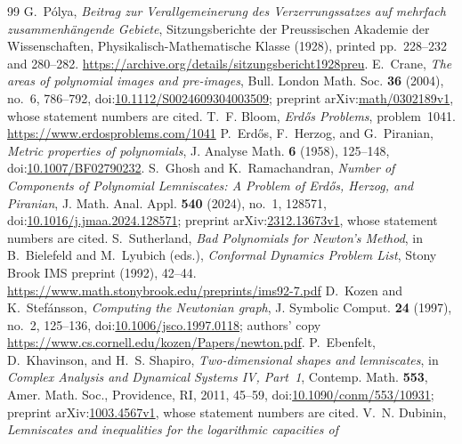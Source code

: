 \documentclass[11pt]{article}
\begin{document}
\begin{thebibliography}{99}
 G.~P\'olya,
  \emph{Beitrag zur Verallgemeinerung des Verzerrungssatzes auf mehrfach
  zusammenh\"angende Gebiete}, Sitzungsberichte der Preussischen Akademie der
  Wissenschaften, Physikalisch-Mathematische Klasse (1928), printed
  pp.~228--232 and 280--282.
  \url{https://archive.org/details/sitzungsbericht1928preu}.
 E.~Crane,
  \emph{The areas of polynomial images and pre-images}, Bull. London Math.
  Soc. \textbf{36} (2004), no.~6, 786--792,
  doi:\href{https://doi.org/10.1112/S0024609304003509}{10.1112/S0024609304003509};
  preprint arXiv:\href{https://arxiv.org/abs/math/0302189v1}{math/0302189v1},
  whose statement numbers are cited.
 T.~F. Bloom, \emph{Erd\H{o}s Problems}, problem~1041.
  \url{https://www.erdosproblems.com/1041}
 P.~Erd\H{o}s, F.~Herzog, and G.~Piranian,
  \emph{Metric properties of polynomials}, J. Analyse Math. \textbf{6}
  (1958), 125--148,
  doi:\href{https://doi.org/10.1007/BF02790232}{10.1007/BF02790232}.
 S.~Ghosh and K.~Ramachandran,
  \emph{Number of Components of Polynomial Lemniscates: A Problem of Erd\H{o}s,
  Herzog, and Piranian}, J. Math. Anal. Appl. \textbf{540} (2024), no.~1,
  128571,
  doi:\href{https://doi.org/10.1016/j.jmaa.2024.128571}{10.1016/j.jmaa.2024.128571};
  preprint arXiv:\href{https://arxiv.org/abs/2312.13673v1}{2312.13673v1},
  whose statement numbers are cited.
 S.~Sutherland,
  \emph{Bad Polynomials for Newton's Method}, in B.~Bielefeld and M.~Lyubich
  (eds.), \emph{Conformal Dynamics Problem List}, Stony Brook IMS preprint
  (1992), 42--44.
  \url{https://www.math.stonybrook.edu/preprints/ims92-7.pdf}
 D.~Kozen and K.~Stef\'ansson,
  \emph{Computing the Newtonian graph}, J. Symbolic Comput. \textbf{24}
  (1997), no.~2, 125--136,
  doi:\href{https://doi.org/10.1006/jsco.1997.0118}{10.1006/jsco.1997.0118};
  authors' copy \url{https://www.cs.cornell.edu/kozen/Papers/newton.pdf}.
 P.~Ebenfelt, D.~Khavinson, and H.~S. Shapiro,
  \emph{Two-dimensional shapes and lemniscates}, in \emph{Complex Analysis and
  Dynamical Systems IV, Part~1}, Contemp. Math. \textbf{553}, Amer. Math. Soc.,
  Providence, RI, 2011, 45--59,
  doi:\href{https://doi.org/10.1090/conm/553/10931}{10.1090/conm/553/10931};
  preprint arXiv:\href{https://arxiv.org/abs/1003.4567v1}{1003.4567v1},
  whose statement numbers are cited.
 V.~N. Dubinin,
  \emph{Lemniscates and inequalities for the logarithmic capacities of
}
\end{thebibliography}
\end{document}
